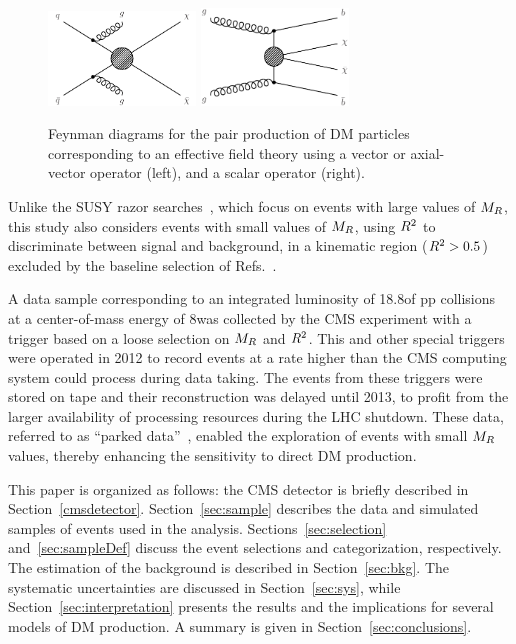 \begin{figure}
 \centering
\includegraphics[width=0.35\textwidth]{Diagrams/RazorDMdiagram.pdf}
\includegraphics[width=0.35\textwidth]{Diagrams/dmdm_bbar.pdf}
 \caption{Feynman diagrams for the pair production of DM particles
   corresponding to an effective field theory using a vector or
   axial-vector operator (left), and a scalar operator (right).\label{fig:DMdiamgrams}}
\end{figure}


Unlike the SUSY razor searches~\cite{Razor8TeV,razor2010}, which focus on events with large
values of $M_R$, this study also considers events with small values
of $M_R$, using $R^2$ to discriminate
between signal and background, in a kinematic region ($R^2 >
0.5$) excluded by the baseline selection of Refs.~\cite{Razor8TeV,razor2010}.

A data sample corresponding to an integrated luminosity of
18.8\fbinv of pp collisions at a center-of-mass energy of 8\TeV  was collected by the CMS experiment
 with a trigger based on a
loose selection on $M_R$ and $R^2$. This and other
special triggers were operated in 2012 to record events at a rate
higher than the CMS computing system could process during data
taking. The events from these triggers were stored on tape and their
reconstruction was delayed until 2013, to profit from the larger availability of processing resources during the LHC shutdown.
These data, referred to as ``parked data''~\cite{CMS-DP-2012-022},
enabled the exploration of events with small $M_R$
values, thereby enhancing the sensitivity to direct DM production.

This paper is organized as follows: the CMS detector is briefly described
in Section~\ref{cmsdetector}.  Section~\ref{sec:sample}
describes the data and simulated samples of events used in the
analysis. Sections~\ref{sec:selection} and~\ref{sec:sampleDef} discuss
the event selections and categorization, respectively. The
estimation of the background is described in Section~\ref{sec:bkg}.
The systematic uncertainties are discussed in Section~\ref{sec:sys},
while Section~\ref{sec:interpretation} presents the results and the
implications for several models of DM production. A summary is given in Section~\ref{sec:conclusions}.

